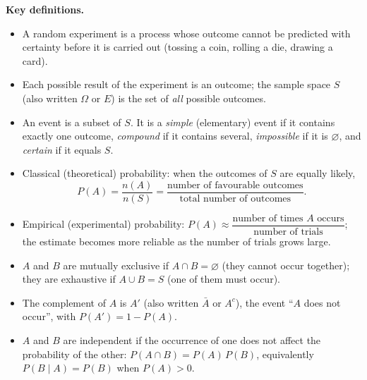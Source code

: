 \documentclass[11pt]{article}
\newcommand{\cle}[1]{{\popxbold\color{popdark}#1}}
\begin{document}
\begin{aretenir}
\textbf{Key definitions.}
\begin{itemize}
\item A \cle{random experiment} is a process whose outcome cannot be predicted with certainty before it is carried out (tossing a coin, rolling a die, drawing a card).
\item Each possible result of the experiment is an \cle{outcome}; the \cle{sample space} $S$ (also written $\Omega$ or $E$) is the set of \emph{all} possible outcomes.
\item An \cle{event} is a subset of $S$. It is a \emph{simple} (elementary) event if it contains exactly one outcome, \emph{compound} if it contains several, \emph{impossible} if it is $\varnothing$, and \emph{certain} if it equals $S$.
\item \cle{Classical (theoretical) probability}: when the outcomes of $S$ are equally likely,
\[ P(A)=\frac{n(A)}{n(S)}=\frac{\text{number of favourable outcomes}}{\text{total number of outcomes}}. \]
\item \cle{Empirical (experimental) probability}: $P(A)\approx \dfrac{\text{number of times }A\text{ occurs}}{\text{number of trials}}$; the estimate becomes more reliable as the number of trials grows large.
\item $A$ and $B$ are \cle{mutually exclusive} if $A\cap B=\varnothing$ (they cannot occur together); they are \cle{exhaustive} if $A\cup B=S$ (one of them must occur).
\item The \cle{complement} of $A$ is $A'$ (also written $\bar{A}$ or $A^c$), the event ``$A$ does not occur'', with $P(A')=1-P(A)$.
\item $A$ and $B$ are \cle{independent} if the occurrence of one does not affect the probability of the other: $P(A\cap B)=P(A)\,P(B)$, equivalently $P(B\mid A)=P(B)$ when $P(A)>0$.
\end{itemize}


\end{aretenir}
\end{document}
